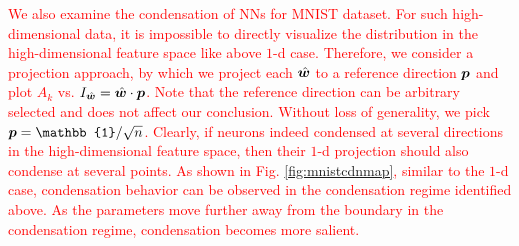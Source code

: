 \documentclass{article}
\begin{document}
\textcolor{red}{We also examine the condensation of NNs for MNIST dataset. For such high-dimensional data, it is impossible to directly visualize the distribution in the high-dimensional feature space like above $1$-d case. Therefore, we consider a projection approach, by which we project each $\hat{\bm{w}}$ to a reference direction $\bm{p}$ and plot $A_k$ vs. $I_{\hat{\bm{w}}}=\hat{\bm{w}}\cdot \bm{p}$. Note that the reference direction can be arbitrary selected and does not affect our conclusion. Without loss of generality, we pick $\vp=\mathbb{1}/\sqrt{n}$. Clearly, if neurons indeed condensed at several directions in the high-dimensional feature space, then their $1$-d projection should also condense at several points. As shown in  Fig. \ref{fig:mnistcdnmap}, similar to the $1$-d case, 
condensation behavior can be observed in the condensation regime identified above. As the parameters move further away from the boundary in the condensation regime, condensation becomes more salient.}
\end{document}
